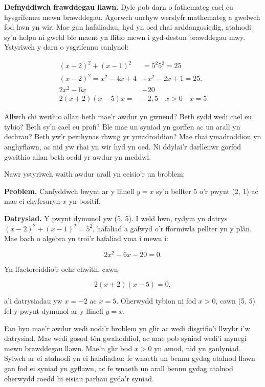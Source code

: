 \documentclass{article}
\begin{document}
\begin{multicols}{2}
\vspace{4mm}

\textbf{Defnyddiwch frawddegau llawn.}
Dyle pob darn o fathemateg cael eu hysgrifennu mewn brawddegau.
Agorwch unrhyw werslyfr mathemateg a gwelwch fod hwn yn wir.
Mae gan hafaliadau, hyd yn oed rhai arddangosiedig, atalnodi sy'n helpu ni gweld
ble maent yn ffitio mewn i gyd-destun brawddegau mwy.
Ystyriwch y darn o ysgrifennu canlynol:

\begin{align*}
(x - 2)^2 + (x - 1)^2 &= 5^2 5^2 = 25\\
(x - 2)^2 = x^2 - 4x + 4 &+ x^2 - 2x + 1 = 25.\\
2x^2 - 6x &- 20\\
2(x + 2)(x - 5)x = &-2, 5 \quad x > 0 \quad x = 5
\end{align*}

Allwch chi weithio allan beth mae'r awdur yn gwneud?
Beth sydd wedi cael eu tybio?
Beth sy'n cael eu profi?
Ble mae un syniad yn gorffen ac un arall yn dechrau?
Beth yw'r perthynas rhwng yr ymadroddion?
Mae rhai ymadroddion yn anghyflawn, ac nid yw rhai yn wir hyd yn oed.
Ni ddylai'r darllenwr gorfod gweithio allan beth oedd yr awdur yn meddwl.

Nawr ystyriwch waith awdur arall yn ceisio'r un broblem:

\setlength{\leftskip}{0.7cm}

\textbf{Problem.} Canfyddwch bwynt ar y llinell $y = x$ sy'n bellter 5 o'r pwynt
(2, 1) ac mae ei chyfesuryn-$x$ yn bositif.

\textbf{Datrysiad.} Y pwynt dymunol yw (5, 5).
I weld hwn, rydym yn datrys $(x - 2)^2 + (x - 1)^2 = 5^2$, hafaliad a gafwyd o'r
fformiwla pellter yn y pl\^{a}n.
Mae bach o algebra yn troi'r hafaliad yma i mewn i:

\begin{equation*}
2x^2 - 6x - 20 = 0.
\end{equation*}

Yn ffactoreiddio'r ochr chwith, cawn

\begin{equation*}
2(x + 2)(x - 5) = 0,
\end{equation*}

a'i datrysiadau yw $x = -2$ ac $x = 5$.
Oherwydd tybion ni fod $x > 0$, cawn (5, 5) fel y pwynt dymunol ar y llinell
$y = x$.

\setlength{\leftskip}{0pt}

Fan hyn mae'r awdur wedi nodi'r broblem yn glir ac wedi disgrifio'i llwybr i'w
datrysiad.
Mae wedi gosod t\^{o}n gwahoddiol, ac mae pob syniad wedi'i mynegi mewn
brawddegau llawn.
Mae'n glir bod $x > 0$ yn amod, nid yn ganlyniad.
Sylwch ar ei atalnodi yn ei hafaliadau: fe wnaeth un bennu gydag atalnod llawn
gan fod ei syniad yn gyflawn, ac fe wnaeth un arall bennu gydag atalnod oherwydd
roedd hi eisiau parhau gyda'r syniad.


\end{multicols}
\end{document}
